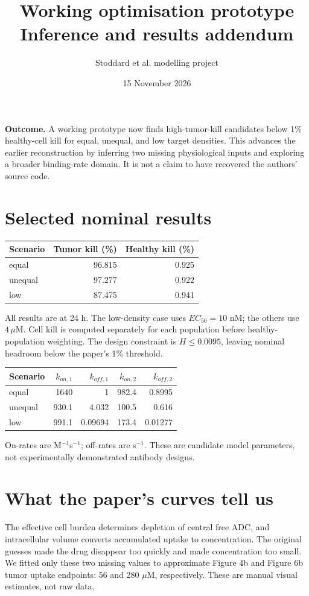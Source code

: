 \documentclass[11pt,a4paper]{article}
\title{Working optimisation prototype\\Inference and results addendum}
\author{Stoddard et al. modelling project}\date{15 November 2026}
\begin{document}
\maketitle
\textbf{Outcome.} A working prototype now finds high-tumor-kill candidates below 1\% healthy-cell kill for equal, unequal, and low target densities. This advances the earlier reconstruction by inferring two missing physiological inputs and exploring a broader binding-rate domain. It is not a claim to have recovered the authors' source code.

\section{Selected nominal results}
\begin{center}\begin{tabular}{lrr}\toprule
Scenario & Tumor kill (\%) & Healthy kill (\%)\\\midrule
equal & 96.815 & 0.925\\
unequal & 97.277 & 0.922\\
low & 87.475 & 0.941\\
\bottomrule\end{tabular}\end{center}
All results are at 24 h. The low-density case uses $EC_{50}=10$ nM; the others use $4\,\mu$M. Cell kill is computed separately for each population before healthy-population weighting. The design constraint is $H\le0.0095$, leaving nominal headroom below the paper's 1\% threshold.

\begin{center}\begin{tabular}{lrrrr}\toprule
Scenario & $k_{on,1}$ & $k_{off,1}$ & $k_{on,2}$ & $k_{off,2}$\\\midrule
equal & 1640 & 1 & 982.4 & 0.8995\\
unequal & 930.1 & 4.032 & 100.5 & 0.616\\
low & 991.1 & 0.09694 & 173.4 & 0.01277\\
\bottomrule\end{tabular}\end{center}
On-rates are M$^{-1}$s$^{-1}$; off-rates are s$^{-1}$. These are candidate model parameters, not experimentally demonstrated antibody designs.

\section{What the paper's curves tell us}
The effective cell burden determines depletion of central free ADC, and intracellular volume converts accumulated uptake to concentration. The original guesses made the drug disappear too quickly and made concentration too small. We fitted only these two missing values to approximate Figure 4b and Figure 6b tumor uptake endpoints: 56 and 280 $\mu$M, respectively. These are manual visual estimates, not raw data.
\end{document}

